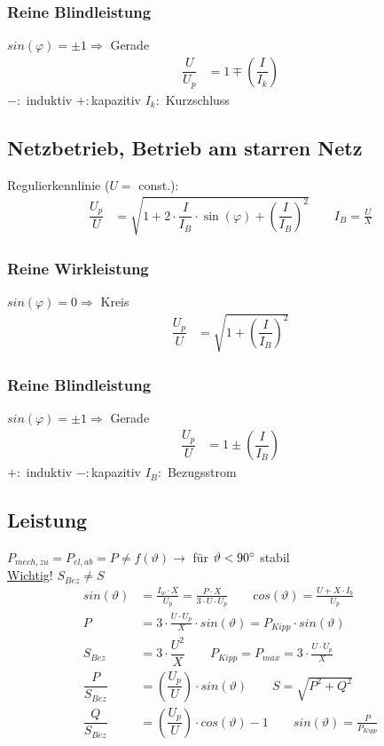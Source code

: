 \subsubsection{Reine Blindleistung}
$    sin(\varphi) = \pm1 \Rightarrow$ Gerade
\begin{align*}
    \dfrac{U}{U_p} &= 1 \mp \left(\dfrac{I}{I_k}\right)
\end{align*}
$- :$ induktiv \qquad $+ :$kapazitiv \qquad
$I_k :$ Kurzschluss

\subsection{Netzbetrieb, Betrieb am starren Netz}
Regulierkennlinie ($U=$ const.):
\begin{align*}
    \dfrac{U_p}{U} &=  \sqrt{1+2\cdot \dfrac{I}{I_B} \cdot \sin(\varphi) + \left( \dfrac{I}{I_B}\right)^2} \qquad I_B = \frac{U}{X}
\end{align*}
\subsubsection{Reine Wirkleistung}
$sin(\varphi) = 0 \Rightarrow$ Kreis
\begin{align*}
    \dfrac{U_p}{U} &= \sqrt{1+ \left(\dfrac{I}{I_B}\right)^2}
\end{align*}

\subsubsection{Reine Blindleistung}
$    sin(\varphi) = \pm1 \Rightarrow$ Gerade
\begin{align*}
    \dfrac{U_p}{U} &= 1 \pm \left(\dfrac{I}{I_B}\right)
\end{align*}
$+ :$ induktiv \qquad $- :$kapazitiv \qquad $I_B :$ Bezugsstrom

\subsection{Leistung}
$P_{mech,zu} = P_{el,ab} = P \neq f(\vartheta) \rightarrow$ für $\vartheta < 90\degree$ stabil\\
\ul{Wichtig}! $S_{Bez} \neq S$
\begin{align*}
    sin(\vartheta) &= \frac{I_w\cdot X}{U_p} = \frac{P\cdot X}{3\cdot U \cdot U_p}  \qquad cos(\vartheta) = \frac{U+X \cdot I_b}{U_p}\\
    P &= 3 \cdot \frac{U\cdot U_p}{X} \cdot sin(\vartheta) = P_{Kipp} \cdot sin(\vartheta)\\
    S_{Bez} &= 3 \cdot \dfrac{U^2}{X} \qquad P_{Kipp} = P_{max} = 3\cdot \frac{U \cdot U_p}{X}\\
    \dfrac{P}{S_{Bez}} &= \left(\dfrac{U_p}{U}\right) \cdot sin(\vartheta) \qquad S = \sqrt{P^2+Q^2}\\
    \dfrac{Q}{S_{Bez}} &= \left(\dfrac{U_p}{U}\right) \cdot cos(\vartheta) -1 \qquad sin{(\vartheta)}=\frac{P}{P_{Kipp}}\\
\end{align*}

